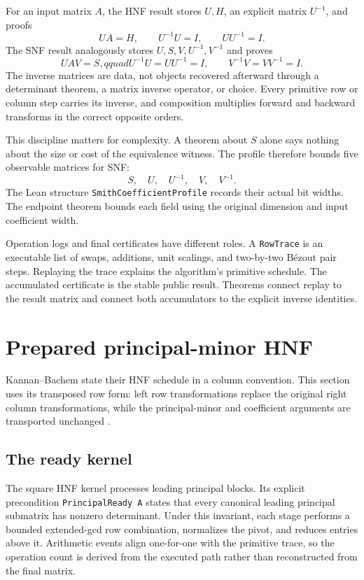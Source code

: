 \documentclass[11pt]{article}
\newcommand{\code}[1]{\texttt{#1}}
\begin{document}
For an input matrix \(A\), the HNF result stores \(U,H\), an explicit matrix
\(U^{-1}\), and proofs
\[
  UA=H,\qquad U^{-1}U=I,\qquad UU^{-1}=I.
\]
The SNF result analogously stores \(U,S,V,U^{-1},V^{-1}\) and proves
\[
  UAV=S,qquad U^{-1}U=UU^{-1}=I,
  \qquad V^{-1}V=VV^{-1}=I.
\]
The inverse matrices are data, not objects recovered afterward through a
determinant theorem, a matrix inverse operator, or choice.  Every primitive
row or column step carries its inverse, and composition multiplies forward
and backward transforms in the correct opposite orders.

This discipline matters for complexity.  A theorem about \(S\) alone says
nothing about the size or cost of the equivalence witness.  The profile
therefore bounds five observable matrices for SNF:
\[
  S,\quad U,\quad U^{-1},\quad V,\quad V^{-1}.
\]
The Lean structure \code{SmithCoefficientProfile} records their actual bit
widths.  The endpoint theorem bounds each field using the original dimension
and input coefficient width.

Operation logs and final certificates have different roles.  A
\code{RowTrace} is an executable list of swaps, additions, unit scalings, and
two-by-two B\'ezout pair steps.  Replaying the trace explains the algorithm's
primitive schedule.  The accumulated certificate is the stable public
result.  Theorems connect replay to the result matrix and connect both
accumulators to the explicit inverse identities.

\section{Prepared principal-minor HNF}

Kannan--Bachem state their HNF schedule in a column convention.  This section
uses its transposed row form: left row transformations replace the original
right column transformations, while the principal-minor and coefficient
arguments are transported unchanged \citep[Algorithm HNF and Theorem
2]{kannanBachem1979}.

\subsection{The ready kernel}

The square HNF kernel processes leading principal blocks.  Its explicit
precondition \code{PrincipalReady A} states that every canonical leading
principal submatrix has nonzero determinant.  Under this invariant, each
stage performs a bounded extended-gcd row combination, normalizes the pivot,
and reduces entries above it.  Arithmetic events align one-for-one with the
primitive trace, so the operation count is derived from the executed path
rather than reconstructed from the final matrix.
\end{document}
